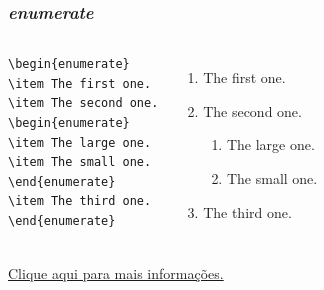 \documentclass[article]{beamer}%
\begin{document}
\begin{frame}[fragile]
\frametitle{\emph{enumerate}}

\begin{columns}
\begin{block}
\scriptsize{
\begin{verbatim}
\begin{enumerate}
\item The first one.
\item The second one.
\begin{enumerate}
\item The large one.
\item The small one.
\end{enumerate}
\item The third one.
\end{enumerate}
\end{verbatim}
}
\end{block}

\begin{enumerate}
\item The first one.
\item The second one.
\begin{enumerate}
\item The large one.
\item The small one.
\end{enumerate}
\item The third one.
\end{enumerate}
\end{columns}
\vspace{1.5cm}
\href{https://tug.ctan.org/macros/latex/contrib/beamer/doc/beameruserguide.pdf}{Clique aqui para mais informações.}

\end{frame}
\end{document}
